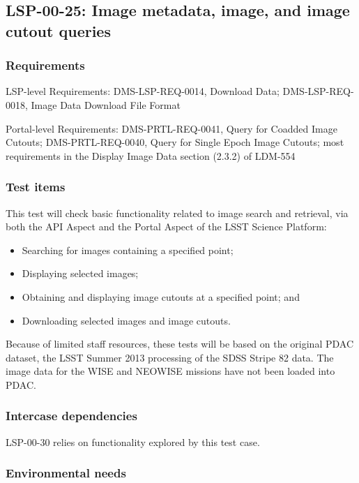 \subsection{LSP-00-25: Image metadata, image, and image cutout queries}
\label{lsp-00-25}

\subsubsection{Requirements}

LSP-level Requirements: DMS-LSP-REQ-0014, Download Data; DMS-LSP-REQ-0018, Image Data Download File Format

Portal-level Requirements: DMS-PRTL-REQ-0041, Query for Coadded Image Cutouts; DMS-PRTL-REQ-0040, Query for Single Epoch Image Cutouts; most requirements in the Display Image Data section (2.3.2) of LDM-554

\subsubsection{Test items}

This test will check basic functionality related to image search and retrieval, via both the API Aspect and the Portal Aspect of the LSST Science Platform:

\begin{itemize}

  \item{Searching for images containing a specified point;}
  \item{Displaying selected images;}
  \item{Obtaining and displaying image cutouts at a specified point; and}
  \item{Downloading selected images and image cutouts.}

\end{itemize}

Because of limited staff resources, these tests will be based on the original PDAC dataset, the LSST Summer 2013 processing of the SDSS Stripe 82 data.
The image data for the WISE and NEOWISE missions have not been loaded into PDAC.

\subsubsection{Intercase dependencies}

LSP-00-30 relies on functionality explored by this test case.

\subsubsection{Environmental needs}

